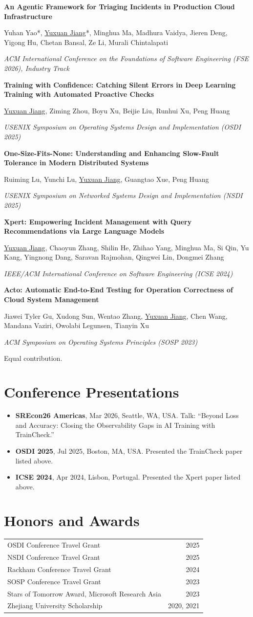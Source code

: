 \documentclass[11pt,letterpaper]{article}
\newcommand{\pubentry}[3]{\Needspace{5\baselineskip}%
  \textbf{#1}\par #2\par\textit{#3}\par\vspace{0.35em}}
\begin{document}
\pubentry{An Agentic Framework for Triaging Incidents in Production Cloud
Infrastructure}{Yuhan Yao*, \underline{Yuxuan Jiang}*, Minghua Ma, Madhura
Vaidya, Jieren Deng, Yigong Hu, Chetan Bansal, Ze Li, Murali Chintalapati}{ACM
International Conference on the Foundations of Software Engineering (FSE 2026),
Industry Track}

\pubentry{Training with Confidence: Catching Silent Errors in Deep Learning
Training with Automated Proactive Checks}{\underline{Yuxuan Jiang}, Ziming Zhou,
Boyu Xu, Beijie Liu, Runhui Xu, Peng Huang}{USENIX Symposium on Operating Systems
Design and Implementation (OSDI 2025)}

\pubentry{One-Size-Fits-None: Understanding and Enhancing Slow-Fault Tolerance
in Modern Distributed Systems}{Ruiming Lu, Yunchi Lu, \underline{Yuxuan Jiang},
Guangtao Xue, Peng Huang}{USENIX Symposium on Networked Systems Design and
Implementation (NSDI 2025)}

\pubentry{Xpert: Empowering Incident Management with Query Recommendations via
Large Language Models}{\underline{Yuxuan Jiang}, Chaoyun Zhang, Shilin He,
Zhihao Yang, Minghua Ma, Si Qin, Yu Kang, Yingnong Dang, Saravan Rajmohan,
Qingwei Lin, Dongmei Zhang}{IEEE/ACM International Conference on Software
Engineering (ICSE 2024)}

\pubentry{Acto: Automatic End-to-End Testing for Operation Correctness of Cloud
System Management}{Jiawei Tyler Gu, Xudong Sun, Wentao Zhang, \underline{Yuxuan
Jiang}, Chen Wang, Mandana Vaziri, Owolabi Legunsen, Tianyin Xu}{ACM Symposium on
Operating Systems Principles (SOSP 2023)}

{\small * Equal contribution.}

\section*{Conference Presentations}
\begin{itemize}
\item \textbf{SREcon26 Americas}, Mar 2026, Seattle, WA, USA. Talk: ``Beyond Loss and Accuracy: Closing the Observability Gaps in AI Training with TrainCheck.''
\item \textbf{OSDI 2025}, Jul 2025, Boston, MA, USA. Presented the TrainCheck paper listed above.
\item \textbf{ICSE 2024}, Apr 2024, Lisbon, Portugal. Presented the Xpert paper listed above.
\end{itemize}

\section*{Honors and Awards}
\begin{tabularx}{\textwidth}{@{}Xr@{}}
OSDI Conference Travel Grant & 2025\\
NSDI Conference Travel Grant & 2025\\
Rackham Conference Travel Grant & 2024\\
SOSP Conference Travel Grant & 2023\\
Stars of Tomorrow Award, Microsoft Research Asia & 2023\\
Zhejiang University Scholarship & 2020, 2021
\end{tabularx}
\end{document}
